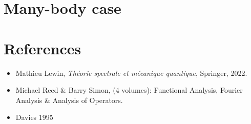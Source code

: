 \documentclass{article}
\begin{document}
\section{Many-body case}

\section*{References}

\begin{itemize}
  \item Mathieu Lewin, \textit{Th\'eorie spectrale et mécanique quantique}, Springer, 2022.
  \item Michael Reed \& Barry Simon, (4 volumes): Functional Analysis, Fourier Analysis \& Analysis of Operators.
  \item Davies 1995 
\end{itemize}
\end{document}

